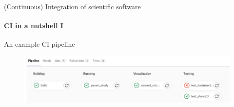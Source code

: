 %
%

\begin{frame}[fragile]{(Continuous) Integration of scientific software} 
\framesubtitle{CI in a nutshell I}

    \vfill

    An example CI pipeline 
    \begin{figure}
        \includegraphics[width=\textwidth]{figures/pipeline-example.png}
    \end{figure}

\end{frame}

